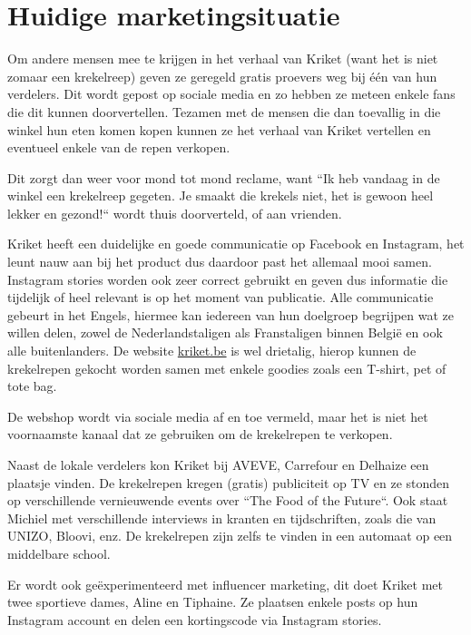 \section{Huidige marketingsituatie}
\label{sec:huidige-marketingsituatie}
Om andere mensen mee te krijgen in het verhaal van Kriket (want het is niet zomaar een krekelreep) geven ze geregeld gratis proevers weg bij één van hun verdelers. Dit wordt gepost op sociale media en zo hebben ze meteen enkele fans die dit kunnen doorvertellen. Tezamen met de mensen die dan toevallig in die winkel hun eten komen kopen kunnen ze het verhaal van Kriket vertellen en eventueel enkele van de repen verkopen.

Dit zorgt dan weer voor mond tot mond reclame, want ``Ik heb vandaag in de winkel een krekelreep gegeten. Je smaakt die krekels niet, het is gewoon heel lekker en gezond!`` wordt thuis doorverteld, of aan vrienden. 

Kriket heeft een duidelijke en goede communicatie op Facebook en Instagram, het leunt nauw aan bij het product dus daardoor past het allemaal mooi samen. Instagram stories worden ook zeer correct gebruikt en geven dus informatie die tijdelijk of heel relevant is op het moment van publicatie. Alle communicatie gebeurt in het Engels, hiermee kan iedereen van hun doelgroep begrijpen wat ze willen delen, zowel de Nederlandstaligen als Franstaligen binnen België en ook alle buitenlanders. De website \href{https://kriket.be}{kriket.be} is wel drietalig, hierop kunnen de krekelrepen gekocht worden samen met enkele goodies zoals een T-shirt, pet of tote bag. 

De webshop wordt via sociale media af en toe vermeld, maar het is niet het voornaamste kanaal dat ze gebruiken om de krekelrepen te verkopen.

Naast de lokale verdelers kon Kriket bij AVEVE, Carrefour en Delhaize een plaatsje vinden. De krekelrepen kregen (gratis) publiciteit op TV en ze stonden op verschillende vernieuwende events over ``The Food of the Future``. Ook staat Michiel met verschillende interviews in kranten en tijdschriften, zoals die van UNIZO, Bloovi, enz. De krekelrepen zijn zelfs te vinden in een automaat op een middelbare school.

Er wordt ook geëxperimenteerd met influencer marketing, dit doet Kriket met twee sportieve dames, Aline en Tiphaine. Ze plaatsen enkele posts op hun Instagram account en delen een kortingscode via Instagram stories.


